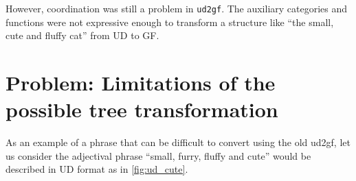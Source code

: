 

However, coordination was still a problem in \verb|ud2gf|. The auxiliary categories and functions were not expressive enough to transform a structure like ``the small, cute and fluffy cat'' from UD to GF.

\FloatBarrier

\section{Problem: Limitations of the possible tree transformation}

As an example of a phrase that can be difficult to convert using the old ud2gf, let us consider the adjectival phrase ``small, furry, fluffy and cute''
would be described in UD format as in \autoref{fig:ud_cute}.



